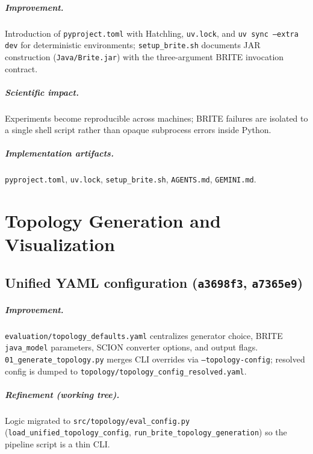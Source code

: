 \documentclass[11pt,a4paper,twoside,openright]{report}
\begin{document}
\paragraph{Improvement.}
Introduction of \texttt{pyproject.toml} with Hatchling, \texttt{uv.lock}, and
\texttt{uv sync --extra dev} for deterministic environments; \texttt{setup\_brite.sh}
documents JAR construction (\texttt{Java/Brite.jar}) with the three-argument BRITE
invocation contract.

\paragraph{Scientific impact.}
Experiments become reproducible across machines; BRITE failures are isolated to
a single shell script rather than opaque subprocess errors inside Python.

\paragraph{Implementation artifacts.}
\texttt{pyproject.toml}, \texttt{uv.lock}, \texttt{setup\_brite.sh},
\texttt{AGENTS.md}, \texttt{GEMINI.md}.

\chapter{Topology Generation and Visualization}

\section{Unified YAML configuration (\texttt{a3698f3}, \texttt{a7365e9})}

\paragraph{Improvement.}
\texttt{evaluation/topology\_defaults.yaml} centralizes generator choice, BRITE
\texttt{java\_model} parameters, SCION converter options, and output flags.
\texttt{01\_generate\_topology.py} merges CLI overrides via
\texttt{--topology-config}; resolved config is dumped to
\texttt{topology/topology\_config\_resolved.yaml}.

\paragraph{Refinement (working tree).}
Logic migrated to \texttt{src/topology/eval\_config.py}
(\texttt{load\_unified\_topology\_config}, \texttt{run\_brite\_topology\_generation})
so the pipeline script is a thin CLI.
\end{document}
